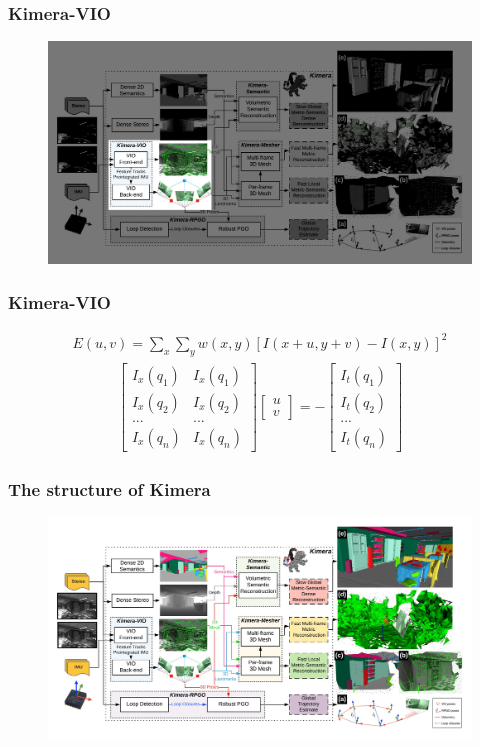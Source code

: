 \documentclass[11pt]{beamer}
\begin{document}
\begin{frame}
\frametitle{Kimera-VIO}
\begin{figure}
    \includegraphics[width=\linewidth]{kimera_chart_VIO.jpeg} 
\end{figure}
\end{frame}
\begin{frame}
    \frametitle{Kimera-VIO} 
\begin{align*}
    E(u,v) = \sum_{x} \sum_y w(x,y) [I(x+u,y+v)- I(x,y)]^2  
\end{align*}
\begin{align*}
           \begin{bmatrix}
               I_x (q_1) & I_x (q_1) \\ I_x (q_2) & I_x (q_2) \\  ... & ... \\I_x (q_n) & I_x (q_n)
           \end{bmatrix} 
           \begin{bmatrix}
               u \\ v
           \end{bmatrix} 
           = - 
           \begin{bmatrix}
               I_t (q_1) \\I_t (q_2) \\  ...\\I_t (q_n) 
           \end{bmatrix} 
\end{align*}
\end{frame}
\begin{frame}
\frametitle{The structure of Kimera}
\begin{figure}
    \includegraphics[width=\linewidth]{kimera_chart_23.jpeg} 
\end{figure}
\end{frame}
\end{document}
